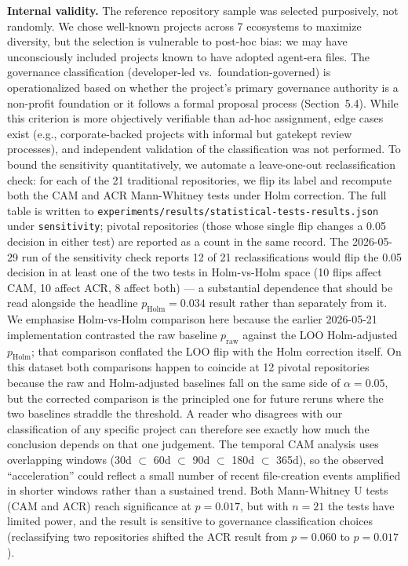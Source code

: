 \documentclass[12pt]{article}
\begin{document}
\textbf{Internal validity.} The reference repository sample was selected purposively, not randomly. We chose well-known projects across 7 ecosystems to maximize diversity, but the selection is vulnerable to post-hoc bias: we may have unconsciously included projects known to have adopted agent-era files. The governance classification (developer-led vs.\ foundation-governed) is operationalized based on whether the project's primary governance authority is a non-profit foundation or it follows a formal proposal process (Section~5.4). While this criterion is more objectively verifiable than ad-hoc assignment, edge cases exist (e.g., corporate-backed projects with informal but gatekept review processes), and independent validation of the classification was not performed. To bound the sensitivity quantitatively, we automate a leave-one-out reclassification check: for each of the 21 traditional repositories, we flip its label and recompute both the CAM and ACR Mann-Whitney tests under Holm correction. The full table is written to \texttt{experiments/results/statistical-tests-results.json} under \texttt{sensitivity}; pivotal repositories (those whose single flip changes a 0.05 decision in either test) are reported as a count in the same record. The 2026-05-29 run of the sensitivity check reports 12 of 21 reclassifications would flip the 0.05 decision in at least one of the two tests in Holm-vs-Holm space (10 flips affect CAM, 10 affect ACR, 8 affect both) --- a substantial dependence that should be read alongside the headline $p_\text{Holm}=0.034$ result rather than separately from it. We emphasise Holm-vs-Holm comparison here because the earlier 2026-05-21 implementation contrasted the raw baseline $p_\text{raw}$ against the LOO Holm-adjusted $p_\text{Holm}$; that comparison conflated the LOO flip with the Holm correction itself. On this dataset both comparisons happen to coincide at 12 pivotal repositories because the raw and Holm-adjusted baselines fall on the same side of $\alpha=0.05$, but the corrected comparison is the principled one for future reruns where the two baselines straddle the threshold. A reader who disagrees with our classification of any specific project can therefore see exactly how much the conclusion depends on that one judgement. The temporal CAM analysis uses overlapping windows (30d $\subset$ 60d $\subset$ 90d $\subset$ 180d $\subset$ 365d), so the observed ``acceleration'' could reflect a small number of recent file-creation events amplified in shorter windows rather than a sustained trend. Both Mann-Whitney U tests (CAM and ACR) reach significance at $p=0.017$, but with $n=21$ the tests have limited power, and the result is sensitive to governance classification choices (reclassifying two repositories shifted the ACR result from $p=0.060$ to $p=0.017$).
\end{document}
